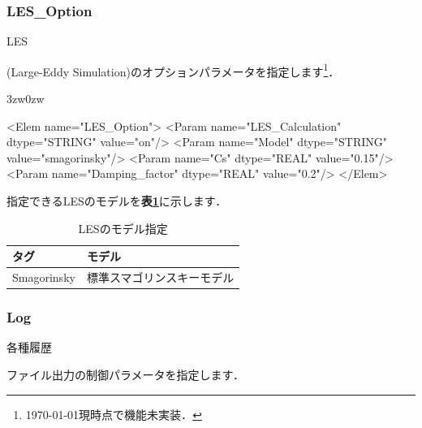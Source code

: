 


\pagebreak
\subsubsection{LES\_Option}

\hypertarget{tgt:les_option}{LES}(Large-Eddy Simulation)のオプションパラメータを指定します\footnote{\today 現時点で機能未実装．}．

\begin{indentation}{3zw}{0zw}

{\small
\begin{program}
<Elem name="LES_Option">
  <Param name="LES_Calculation" dtype="STRING" value="on"/>
  <Param name="Model"           dtype="STRING" value="smagorinsky"/>
  <Param name="Cs"              dtype="REAL"   value="0.15"/>
  <Param name="Damping_factor"  dtype="REAL"   value="0.2"/>
</Elem>
\end{program}
}

指定できるLESのモデルを\textbf{表\ref{tbl:LES_model}}に示します．

\begin{table}[htdp]
\caption{LESのモデル指定}
\begin{center}
\small
\begin{tabular}{ll} \toprule
タグ & モデル\\ \midrule
Smagorinsky & 標準スマゴリンスキーモデル\\ \bottomrule
\end{tabular}
\end{center}
\label{tbl:LES_model}
\end{table}

\end{indentation}



\pagebreak
\subsubsection{Log}

\hypertarget{tgt:log}{各種履歴}ファイル出力の制御パラメータを指定します．

